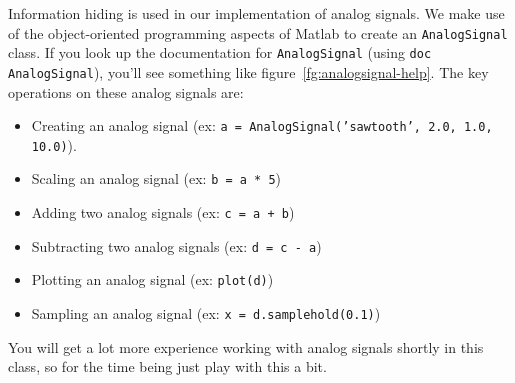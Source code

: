 Information hiding is used in our implementation of analog signals. We
make use of the object-oriented programming aspects of Matlab to
create an \texttt{AnalogSignal} class. If you look up the
documentation for \texttt{AnalogSignal} (using
\verb|doc AnalogSignal|), you'll see something like
figure~\ref{fg:analogsignal-help}. The key operations on these analog
signals are:
\begin{itemize}
\item Creating an analog signal (ex: \texttt{a =
    AnalogSignal('sawtooth', 2.0, 1.0, 10.0)}).
\item Scaling an analog signal (ex: \texttt{b = a * 5})
\item Adding two analog signals (ex: \texttt{c = a + b})
\item Subtracting two analog signals (ex: \texttt{d = c - a})
\item Plotting an analog signal (ex: \texttt{plot(d)})
\item Sampling an analog signal (ex: \texttt{x = d.samplehold(0.1)})
\end{itemize}

You will get a lot more experience working with analog signals shortly
in this class, so for the time being just play with this a bit.

